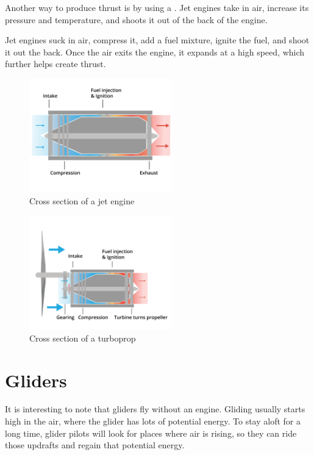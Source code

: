 Another way to produce thrust is by using a . Jet engines take in air, increase its pressure and temperature, and shoots it out of the back of the engine.

Jet engines suck in air, compress it, add a fuel mixture, ignite the fuel, and shoot it out the back. Once the air exits the engine, it expands at a high speed, which further helps create thrust.

\begin{figure}[H]
    \centering
    \includegraphics[width=0.55\textwidth]{jet.png}
    \caption{Cross section of a jet engine}
    \label{fig:jet}
\end{figure}


\begin{figure}[H]
    \centering
    \includegraphics[width=0.55\textwidth]{turboProp.png}
    \caption{Cross section of a turboprop}
    \label{fig:turboProp}
\end{figure}


\section{Gliders}

It is interesting to note that gliders fly without an engine. Gliding usually starts high in the air,  where the glider has lots of potential energy. To stay aloft for a long
time, glider pilots will look for places where air is rising, so they can ride those updrafts and regain that potential energy.

